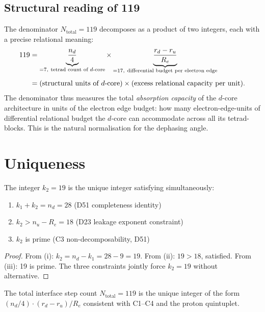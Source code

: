 \documentclass[12pt,a4paper]{article}
\theoremstyle{plain}
\theoremstyle{definition}
\theoremstyle{remark}
\newenvironment{theorembox}[1][]{%
  \begin{tcolorbox}[theoremstyle,title={Theorem\ifx\relax#1\relax\else: #1\fi}]}{\end{tcolorbox}}
\renewcommand{\Re}{R_e}
\newcommand{\ru}{r_u}
\newcommand{\rd}{r_d}
\newcommand{\Ntot}{N_{\mathrm{total}}}
\newcommand{\kone}{k_1}
\newcommand{\ktwo}{k_2}
\begin{document}
\subsection{Structural reading of 119}

The denominator $\Ntot = 119$ decomposes as a product of two integers, each with a precise relational meaning:
\begin{align}
119 &= \underbrace{\frac{n_d}{4}}_{= 7,\ \text{tetrad count of }d\text{-core}} \times \underbrace{\frac{\rd-\ru}{\Re}}_{= 17,\ \text{differential budget per electron edge}} \label{eq:119decomp}\\[4pt]
&= (\text{structural units of }d\text{-core}) \times (\text{excess relational capacity per unit}). \notag
\end{align}
The denominator thus measures the total \emph{absorption capacity} of the $d$-core architecture in units of the electron edge budget: how many electron-edge-units of differential relational budget the $d$-core can accommodate across all its tetrad-blocks. This is the natural normalisation for the dephasing angle.

\section{Uniqueness}
\label{sec:uniqueness}

\begin{theorembox}[Uniqueness of $\ktwo = 19$]
\label{thm:k2unique}
The integer $\ktwo = 19$ is the unique integer satisfying simultaneously:
\begin{enumerate}[label=(\roman*)]
\item $\kone + \ktwo = n_d = 28$ \hfill (D51 completeness identity)
\item $\ktwo > n_u - \Re = 18$ \hfill (D23 leakage exponent constraint)
\item $\ktwo$ is prime \hfill (C3 non-decomposability, D51)
\end{enumerate}
\end{theorembox}

\begin{proof}
From (i): $\ktwo = n_d - \kone = 28 - 9 = 19$. From (ii): $19 > 18$, satisfied. From (iii): 19 is prime. The three constraints jointly force $\ktwo = 19$ without alternative.
\end{proof}

\begin{theorembox}[Uniqueness of $\Ntot = 119$]
\label{thm:Ntotunique}
The total interface step count $\Ntot = 119$ is the unique integer of the form $(n_d/4)\cdot(\rd-\ru)/\Re$ consistent with C1--C4 and the proton quintuplet.
\end{theorembox}
\end{document}
